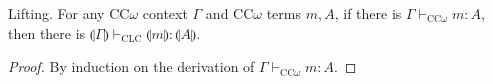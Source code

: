 \documentclass[sigplan,screen,review,anonymous]{acmart}
\newcommand{\lift}[1]{\llparenthesis #1 \rrparenthesis}
\begin{document}
\begin{theorem}\label{lifting}
  Lifting. For any CC$\omega$ context $\Gamma$ and CC$\omega$ terms $m, A$, if there is $\Gamma \vdash_{\scriptscriptstyle \text{CC$\omega$}} m : A$, then there is $\lift{\Gamma} \vdash_{\scriptscriptstyle \text{CLC}} \lift{m} : \lift{A}$.
\end{theorem}
\begin{proof}
  By induction on the derivation of $\Gamma \vdash_{\scriptscriptstyle \text{CC$\omega$}} m : A$.
\end{proof}
\end{document}

